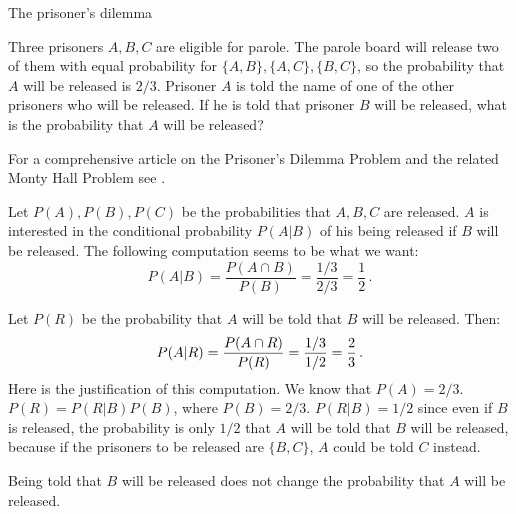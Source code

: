 





\begin{prob}{The prisoner's dilemma}

Three prisoners $A,B,C$ are eligible for parole. The parole board will release two of them with equal probability for $\{A,B\}, \{A,C\}, \{B,C\}$, so the probability that $A$ will be released is $2/3$. Prisoner $A$ is told the name of one of the other prisoners who will be released. If he is told that prisoner $B$ will be released, what is the probability that $A$ will be released?

For a comprehensive article on the Prisoner's Dilemma Problem and the related Monty Hall Problem see \cite{carlton}.
\end{prob}


Let $P(A), P(B), P(C)$ be the probabilities that $A,B,C$ are released. $A$ is interested in the conditional probability $P(A|B)$ of his being released if $B$ will be released. The following computation seems to be what we want:
\[
P(A|B) = \frac{P(A\cap B)}{P(B)} = \frac{1/3}{2/3}=\frac{1}{2}\,.
\]

Let $P(R)$ be the probability that $A$ will be told that $B$ will be released. Then:
\[
P(A|R) = \frac{P(A\cap R)}{P(R)} = \displaystyle\frac{1/3}{1/2}=\displaystyle\frac{2}{3}\,.
\]
Here is the justification of this computation. We know that $P(A)=2/3$. $P(R)=P(R|B)P(B)$, where $P(B)=2/3$. $P(R|B)=1/2$ since even if $B$ is released, the probability is only $1/2$ that $A$ will be told that $B$ will be released, because if the prisoners to be released are $\{B,C\}$, $A$ could be told $C$ instead.

Being told that $B$ will be released does not change the probability that $A$ will be released.

